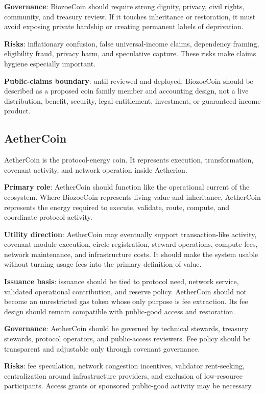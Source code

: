 \documentclass[12pt]{article}
\begin{document}
\textbf{Governance}: BiozoeCoin should require strong dignity, privacy, civil rights, community, and treasury review. If it touches inheritance or restoration, it must avoid exposing private hardship or creating permanent labels of deprivation.

\textbf{Risks}: inflationary confusion, false universal-income claims, dependency framing, eligibility fraud, privacy harm, and speculative capture. These risks make claims hygiene especially important.

\textbf{Public-claims boundary}: until reviewed and deployed, BiozoeCoin should be described as a proposed coin family member and accounting design, not a live distribution, benefit, security, legal entitlement, investment, or guaranteed income product.

\subsection{AetherCoin}

AetherCoin is the protocol-energy coin. It represents execution, transformation, covenant activity, and network operation inside Aetherion.

\textbf{Primary role}: AetherCoin should function like the operational current of the ecosystem. Where BiozoeCoin represents living value and inheritance, AetherCoin represents the energy required to execute, validate, route, compute, and coordinate protocol activity.

\textbf{Utility direction}: AetherCoin may eventually support transaction-like activity, covenant module execution, circle registration, steward operations, compute fees, network maintenance, and infrastructure costs. It should make the system usable without turning usage fees into the primary definition of value.

\textbf{Issuance basis}: issuance should be tied to protocol need, network service, validated operational contribution, and reserve policy. AetherCoin should not become an unrestricted gas token whose only purpose is fee extraction. Its fee design should remain compatible with public-good access and restoration.

\textbf{Governance}: AetherCoin should be governed by technical stewards, treasury stewards, protocol operators, and public-access reviewers. Fee policy should be transparent and adjustable only through covenant governance.

\textbf{Risks}: fee speculation, network congestion incentives, validator rent-seeking, centralization around infrastructure providers, and exclusion of low-resource participants. Access grants or sponsored public-good activity may be necessary.
\end{document}
